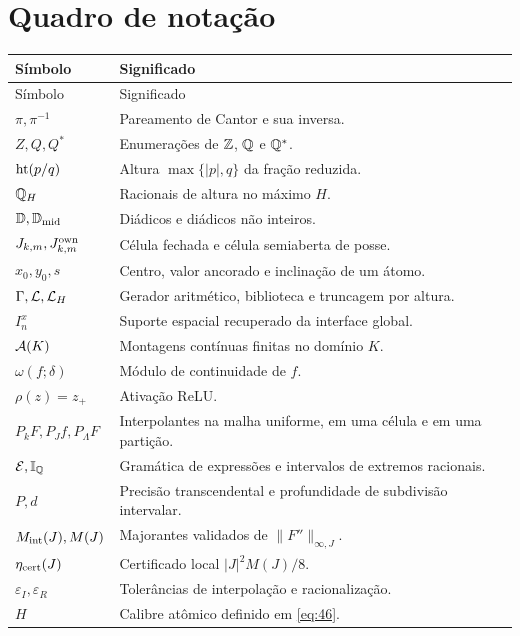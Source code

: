 \section{Quadro de notação}
\footnotesize
\renewcommand{\arraystretch}{1.1}
\begin{longtable}{@{}p{.28\linewidth}p{.68\linewidth}@{}}
\toprule Símbolo&Significado\\\midrule
\endfirsthead
\toprule Símbolo&Significado\\\midrule
\endhead
\bottomrule\endfoot
$\pi,\pi^{-1}$&Pareamento de Cantor e sua inversa.\\
$Z,Q,Q^*$&Enumerações de $\mathbb Z$, $\mathbb Q$ e $\mathbb Q^*$.\\
$\operatorname{ht}(p/q)$&Altura $\max\{|p|,q\}$ da fração reduzida.\\
$\mathbb Q_H$&Racionais de altura no máximo $H$.\\
$\mathbb D,\mathbb D_{\rm mid}$&Diádicos e diádicos não inteiros.\\
$J_{k,m},J_{k,m}^{\rm own}$&Célula fechada e célula semiaberta de posse.\\
$x_0,y_0,s$&Centro, valor ancorado e inclinação de um átomo.\\
$\Gamma,\mathcal L,\mathcal L_H$&Gerador aritmético, biblioteca e truncagem por altura.\\
$I_n^x$&Suporte espacial recuperado da interface global.\\
$\mathcal A(K)$&Montagens contínuas finitas no domínio $K$.\\
$\omega(f;\delta)$&Módulo de continuidade de $f$.\\
$\rho(z)=z_+$&Ativação ReLU.\\
$P_kF,P_Jf,P_\Lambda F$&Interpolantes na malha uniforme, em uma célula e em uma partição.\\
$\mathcal E,\mathbb I_{\mathbb Q}$&Gramática de expressões e intervalos de extremos racionais.\\
$P,d$&Precisão transcendental e profundidade de subdivisão intervalar.\\
$M_{\rm int}(J),M(J)$&Majorantes validados de $\|F''\|_{\infty,J}$.\\
$\eta_{\rm cert}(J)$&Certificado local $|J|^2M(J)/8$.\\
$\varepsilon_I,\varepsilon_R$&Tolerâncias de interpolação e racionalização.\\
$H$&Calibre atômico definido em \eqref{eq:46}.\\
\end{longtable}
\normalsize

